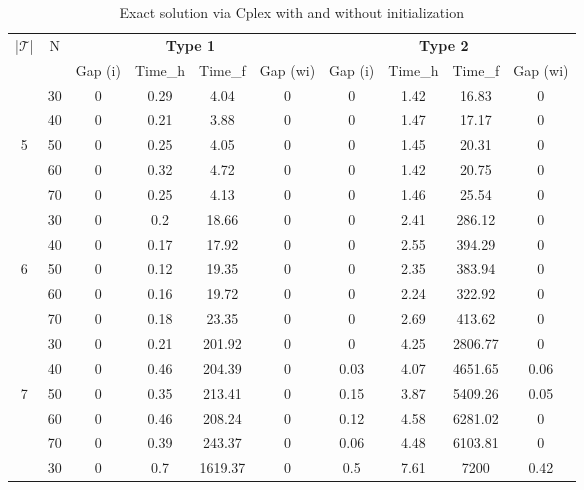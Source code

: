 \documentclass{itor}
\theoremstyle{definition}
\theoremstyle{remark}
\begin{document}
\begin{table}[htbp]
  \centering
  \tiny
  \caption{Exact solution via Cplex with and without initialization}
    \begin{tabular}{|c|c|cccc|cccc|}
    \toprule
    \multirow{2}[2]{*}{|$\mathcal T$|} & \multirow{2}[2]{*}{N} &       & \multicolumn{2}{c}{\textbf{Type 1}} &       &       & \multicolumn{2}{c}{\textbf{Type 2}} &  \\
          &       & Gap (i) & Time\_h & Time\_f & Gap (wi) & Gap (i) & Time\_h & Time\_f & Gap (wi) \\
    \midrule
          & 30    & 0     & 0.29  & 4.04  & 0     & 0     & 1.42  & 16.83 & 0 \\
          & 40    & 0     & 0.21  & 3.88  & 0     & 0     & 1.47  & 17.17 & 0 \\
    5     & 50    & 0     & 0.25  & 4.05  & 0     & 0     & 1.45  & 20.31 & 0 \\
          & 60    & 0     & 0.32  & 4.72  & 0     & 0     & 1.42  & 20.75 & 0 \\
          & 70    & 0     & 0.25  & 4.13  & 0     & 0     & 1.46  & 25.54 & 0 \\
    \midrule
          & 30    & 0     & 0.2   & 18.66 & 0     & 0     & 2.41  & 286.12 & 0 \\
          & 40    & 0     & 0.17  & 17.92 & 0     & 0     & 2.55  & 394.29 & 0 \\
    6     & 50    & 0     & 0.12  & 19.35 & 0     & 0     & 2.35  & 383.94 & 0 \\
          & 60    & 0     & 0.16  & 19.72 & 0     & 0     & 2.24  & 322.92 & 0 \\
          & 70    & 0     & 0.18  & 23.35 & 0     & 0     & 2.69  & 413.62 & 0 \\
    \midrule
          & 30    & 0     & 0.21  & 201.92 & 0     & 0     & 4.25  & 2806.77 & 0 \\
          & 40    & 0     & 0.46  & 204.39 & 0     & 0.03  & 4.07  & 4651.65 & 0.06 \\
    7     & 50    & 0     & 0.35  & 213.41 & 0     & 0.15  & 3.87  & 5409.26 & 0.05 \\
          & 60    & 0     & 0.46  & 208.24 & 0     & 0.12  & 4.58  & 6281.02 & 0 \\
          & 70    & 0     & 0.39  & 243.37 & 0     & 0.06  & 4.48  & 6103.81 & 0 \\
    \midrule
          & 30    & 0     & 0.7   & 1619.37 & 0     & 0.5   & 7.61  & 7200  & 0.42 \\

\end{tabular}
\end{table}
\end{document}
